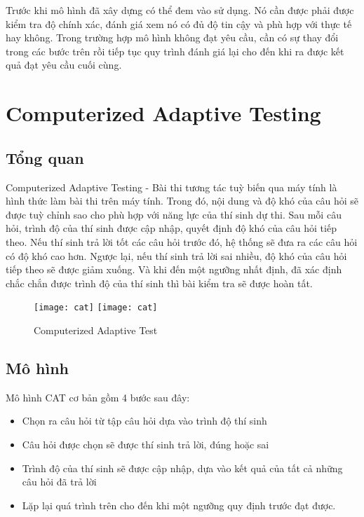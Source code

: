 Trước khi mô hình đã xây dựng có thể đem vào sử dụng. Nó cần được phải được kiểm tra độ chính xác, đánh giá xem nó có đủ độ tin cậy và phù hợp với thực tế hay không. Trong trường hợp mô hình không đạt yêu cầu, cần có sự thay đổi trong các bước trên rồi tiếp tục quy trình đánh giá lại cho đến khi ra được kết quả đạt yêu cầu cuối cùng.	

\section{Computerized Adaptive Testing}

\subsection{Tổng quan}
Computerized Adaptive Testing - Bài thi tương tác tuỳ biến qua máy tính là hình thức làm bài thi trên máy tính. Trong đó, nội dung và độ khó của câu hỏi sẽ được tuỳ chỉnh sao cho phù hợp với năng lực của thí sinh dự thi. Sau mỗi câu hỏi, trình độ của thí sinh được cập nhập, quyết định độ khó của câu hỏi tiếp theo. Nếu thí sinh trả lời tốt các câu hỏi trước đó, hệ thống sẽ đưa ra các câu hỏi có độ khó cao hơn. Ngược lại, nếu thí sinh trả lời sai nhiều, độ khó của câu hỏi tiếp theo sẽ được giảm xuống. Và khi đến một ngưỡng nhất định, đã xác định chắc chắn được trình độ của thí sinh thì bài kiểm tra sẽ được hoàn tất.\\

 \begin{figure}[H]
  \begin{center}
    \ifpdf
      \texttt{[image: cat]}
    \else
      \texttt{[image: cat]}
    \fi
    \caption{Computerized Adaptive Test\cite{kornferry}}
    \label{ComputerizeAdaptiveTest}
  \end{center}
\end{figure}

\subsection{Mô hình}
Mô hình CAT cơ bản gồm 4 bước sau đây:
\begin{itemize}
	\item Chọn ra câu hỏi từ tập câu hỏi dựa vào trình độ thí sinh
	\item Câu hỏi được chọn sẽ được thí sinh trả lời, đúng hoặc sai
	\item Trình độ của thí sinh sẽ được cập nhập, dựa vào kết quả của tất cả những câu hỏi đã trả lời
	\item Lặp lại quá trình trên cho đến khi một ngưỡng quy định trước đạt được.
\end{itemize} 

